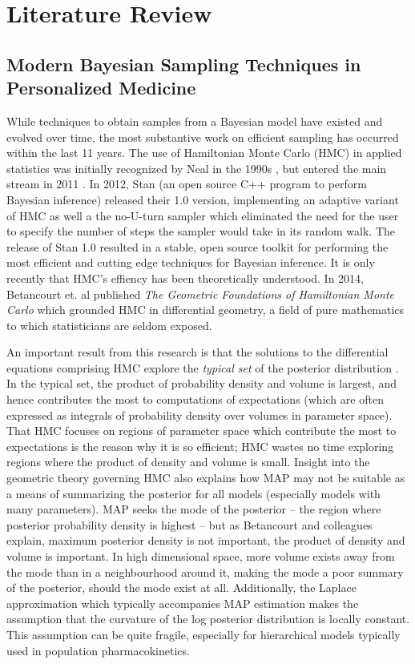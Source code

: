 \chapter{Literature Review}

\section{Modern Bayesian Sampling Techniques in Personalized Medicine}

While techniques to obtain samples from a Bayesian model have existed and evolved over time, the most substantive work on efficient sampling has occurred within the last 11 years.  The use of Hamiltonian Monte Carlo (HMC) in applied statistics was initially recognized by Neal in the 1990s \cite{Neal1996-vn}, but entered the main stream in 2011 \cite{neal2011mcmc}.  In 2012, Stan (an open source C++ program to perform Bayesian inference) released their 1.0 version, implementing an adaptive variant of HMC \cite{neal2011mcmc} as well a the no-U-turn sampler \cite{hoffman2014no} which eliminated the need for the user to specify the number of steps the sampler would take in its random walk.  The release of Stan 1.0 resulted in a stable, open source toolkit for performing the most efficient and cutting edge techniques for Bayesian inference.  It is only recently that HMC's effiency has been theoretically understood.  In 2014, Betancourt et. al published \textit{The Geometric Foundations of Hamiltonian Monte Carlo} \cite{betancourt2017geometric} which grounded HMC in differential geometry, a field of pure mathematics to which statisticians are seldom exposed.

An important result from this research is that the solutions to the differential equations comprising HMC explore the \textit{typical set} of the posterior distribution \cite{Betancourt2017-ak}.  In the typical set, the product of probability density and volume is largest, and hence contributes the most to computations of expectations (which are often expressed as integrals of probability density over volumes in parameter space).  That HMC focuses on regions of parameter space which contribute the most to expectations is the reason why it is so efficient; HMC wastes no time exploring regions where the product of density and volume is small.  Insight into the geometric theory governing HMC also explains how MAP may not be suitable as a means of summarizing the posterior for all models (especially models with many parameters).  MAP seeks the mode of the posterior -- the region where posterior probability density is highest -- but as Betancourt and colleagues explain, maximum posterior density is not important, the product of density and volume is important.  In high dimensional space, more volume exists away from the mode than in a neighbourhood around it, making the mode a poor summary of the posterior, should the mode exist at all.  Additionally, the Laplace approximation which typically accompanies MAP estimation makes the assumption that the curvature of the log posterior distribution is locally constant.  This assumption can be quite fragile, especially for hierarchical models typically used in population pharmacokinetics.

